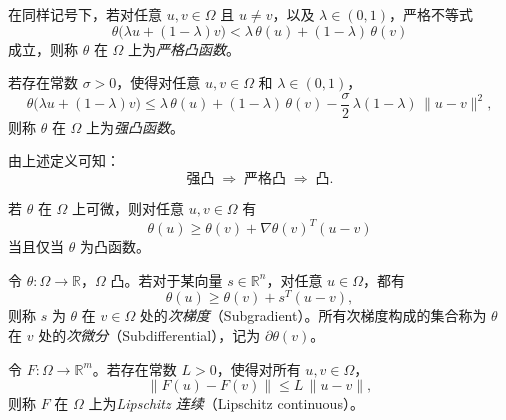 \begin{definition}[严格凸函数]
	在同样记号下，若对任意 $u,v\in\Omega$ 且 $u\neq v$，以及 $\lambda\in(0,1)$，严格不等式
	\[
	\theta\bigl(\lambda u + (1-\lambda) v\bigr)
	< \lambda\,\theta(u) + (1-\lambda)\,\theta(v)
	\]
	成立，则称 $\theta$ 在 $\Omega$ 上为\emph{严格凸函数}。
\end{definition}

\begin{definition}[强凸函数]
	若存在常数 $\sigma>0$，使得对任意 $u,v\in\Omega$ 和 $\lambda\in(0,1)$，
	\[
	\theta\bigl(\lambda u + (1-\lambda) v\bigr)
	\le \lambda\,\theta(u) + (1-\lambda)\,\theta(v)
	- \frac{\sigma}{2}\,\lambda(1-\lambda)\,\|u-v\|^2,
	\]
	则称 $\theta$ 在 $\Omega$ 上为\emph{强凸函数}。
\end{definition}

\begin{remark}
	由上述定义可知：
	\[
	\text{强凸}\;\Longrightarrow\;\text{严格凸}\;\Longrightarrow\;\text{凸}.
	\]
\end{remark}

\begin{definition}[可微凸函数的梯度不等式]
	若 $\theta$ 在 $\Omega$ 上可微，则对任意 $u,v\in\Omega$ 有
	\[
	\theta(u)\ge \theta(v) + \nabla\theta(v)^{T}(u-v)
	\]
	当且仅当 $\theta$ 为凸函数。
\end{definition}

\begin{definition}[次梯度与次微分]
	令 $\theta:\Omega\to\mathbb R$，$\Omega$ 凸。若对于某向量 $s\in\mathbb R^n$，对任意 $u\in\Omega$，都有
	\[
	\theta(u)\ge \theta(v) + s^{T}(u-v),
	\]
	则称 $s$ 为 $\theta$ 在 $v\in\Omega$ 处的\emph{次梯度}（Subgradient）。所有次梯度构成的集合称为 $\theta$ 在 $v$ 处的\emph{次微分}（Subdifferential），记为 $\partial\theta(v)$。
\end{definition}

\begin{definition}[Lipschitz 连续]
	令 $F:\Omega\to\mathbb R^m$。若存在常数 $L>0$，使得对所有 $u,v\in\Omega$，
	\[
	\|F(u)-F(v)\|\le L\,\|u-v\|,
	\]
	则称 $F$ 在 $\Omega$ 上为\emph{Lipschitz 连续}（Lipschitz continuous）。
\end{definition}


